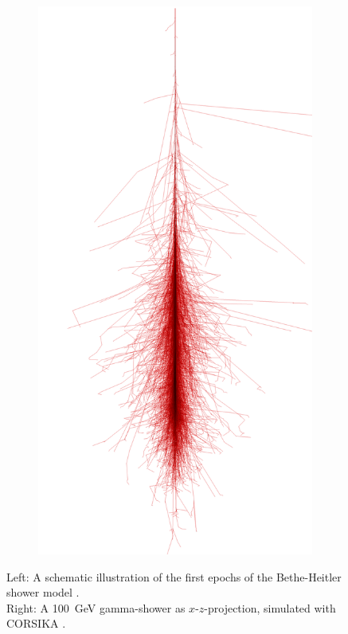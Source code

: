 \begin{figure}
\begin{subfigure}{.15\textwidth}
		\includegraphics[width=\linewidth]{images/corsika_100gev_photon.png}
	\end{subfigure}
	\caption{
		Left: A schematic illustration of the first epochs of the 
		Bethe-Heitler shower model \cite{funk_doctor}. \\
		Right: A \SI{100}{\giga\electronvolt} gamma-shower as $x$-$z$-projection, simulated with CORSIKA \cite{corsika_showers}.}
	\label{fig:gamma_shower}
\end{figure}

